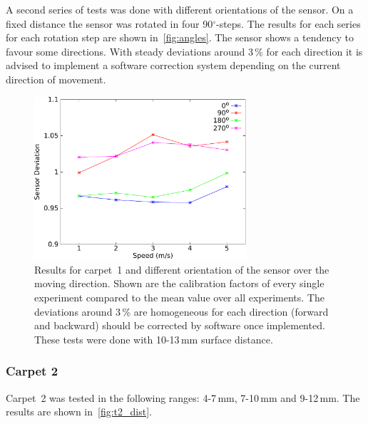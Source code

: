 \documentclass[12pt,a4paper]{article}
\begin{document}
A second series of tests was done with different orientations of the sensor. 
On a fixed distance the sensor was rotated in four 90$^{\circ}$-steps.
The results for each series for each rotation step are shown in~\autoref{fig:angles}.
The sensor shows a tendency to favour some directions. 
With steady deviations around 3\,\% for each direction it is advised to implement a software correction system depending on the current direction of movement.

\begin{figure}[htbp]
\begin{center}
\includegraphics[width=0.7\textwidth]{figures/angles}
\caption{\label{fig:angles}
Results for carpet~1 and different orientation of the sensor over the moving direction.
Shown are the calibration factors of every single experiment compared to the mean value over all experiments.
The deviations around 3\,\% are homogeneous for each direction (forward and backward) should be corrected by software once implemented.
These tests were done with 10-13\,mm surface distance.
}   
\end{center}
\end{figure}



\subsubsection{Carpet 2}

Carpet~2 was tested in the following ranges: 4-7\,mm, 7-10\,mm and 9-12\,mm.
The results are shown in~\autoref{fig:t2_dist}.
\end{document}
